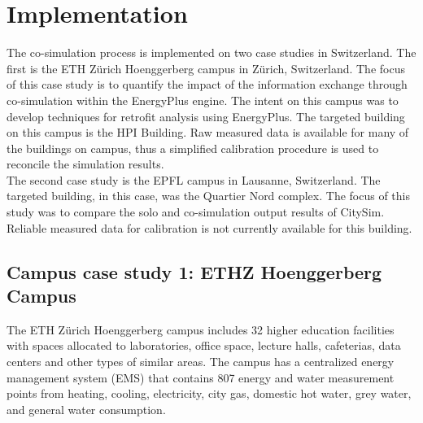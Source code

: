 \documentclass{tBPS2e}
\theoremstyle{plain}
\theoremstyle{definition}
\theoremstyle{remark}
\newcommand{\noteDT}[1]{\footnote{\textcolor{green}{#1}}}
\begin{document}

 
\section{Implementation}\label{Implementation and results}
The co-simulation process is implemented on two case studies in Switzerland.
The first is the ETH Z\"urich Hoenggerberg campus in Z\"urich, Switzerland.
The focus of this case study is to quantify the impact of the information
exchange through co-simulation within the EnergyPlus engine. The intent on
this campus was to develop techniques for retrofit analysis using EnergyPlus.
The targeted building on this campus is the HPI Building. Raw measured data is
available for many of the buildings on campus, thus a simplified calibration
procedure is used to reconcile the simulation results.\\

The second case study is the EPFL campus in Lausanne, Switzerland. The
targeted building, in this case, was the Quartier Nord complex. The focus of
this study was to compare the solo and co-simulation output results of CitySim.
Reliable measured data for calibration is not currently available for this
building.

\subsection{Campus case study 1: ETHZ Hoenggerberg Campus}
The ETH Z\"urich Hoenggerberg campus includes 32 higher education facilities
 with spaces allocated to laboratories, office space, lecture halls,
 cafeterias, data centers and other types of similar areas. The campus has a
 centralized energy management system (EMS) that contains 807 energy and water
 measurement points from heating, cooling, electricity, city gas, domestic hot
 water, grey water, and general water consumption. %
\end{document}

